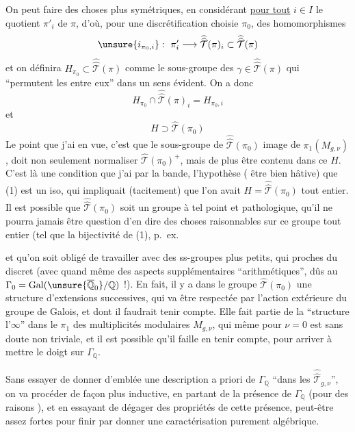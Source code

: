 On peut faire des choses plus symétriques, en considérant \uline{pour tout} $i\in I$ le quotient  $\pi'_i$ de $\pi$, d'où, pour une discrétification choisie $\pi_0$, des homomorphismes
\[
\unsure{i_{\pi_0,i}}:\ \pi'_i\longrightarrow
\widehat{\widehat{\mathcal T}}(\pi)_i\subset
\widehat{\widehat{\mathcal T}}(\pi)
\]
et on définira $H_{\pi_0}\subset\widehat{\widehat{\mathcal T}}(\pi)$ comme le sous-groupe des $\gamma\in\widehat{\widehat{\mathcal T}}(\pi)$ qui ``permutent les  entre eux'' dans un sens évident. On a donc
\[
\tag{7}
H_{\pi_0}\cap\widehat{\widehat{\mathcal T}}(\pi)_i=H_{\pi_0,i}
\]
et
\[
\tag{8}
H\supset\widehat{\mathcal T}(\pi_0)
\]
Le point que j'ai en vue, c'est que le sous-groupe de $\widehat{\widehat{\mathcal T}}(\pi_0)$ image de $\pi_1(M_{g,\nu})$, doit non seulement normaliser $\widehat{\mathcal T}(\pi_0)^+$, mais de plus être contenu dans ce $H$. C'est là une condition que j'ai  par la bande,  l'hypothèse ( être bien hâtive) que (1) est un iso, qui impliquait (tacitement) que l'on avait $H=\widehat{\widehat{\mathcal T}}(\pi_0)$ tout entier. Il est possible que $\widehat{\widehat{\mathcal T}}(\pi_0)$ soit un groupe à tel point  et pathologique, qu'il ne pourra jamais être question d'en dire des choses raisonnables  sur  ce groupe tout entier (tel que la bijectivité de (1), p.\ ex.



et qu'on soit obligé de travailler avec des ss-groupes plus petits, qui  proches du discret (avec quand même des aspects supplémentaires ``arithmétiques'', dûs au $\Gamma_0=\mathrm{Gal}(\unsure{\overline{\mathbb Q}_0}/\mathbb Q)$ !). En fait, il y a  dans le groupe $\widehat{\mathcal T}(\pi_0)$ une structure  d'extensions successives, qui va être respectée par l'action extérieure du groupe de Galois, et dont il faudrait tenir compte. Elle fait partie de la ``structure  l'$\infty$'' dans le $\pi_1$ des  multiplicités modulaires $M_{g,\nu}$, qui même pour $\nu=0$ est sans doute non triviale, et il est possible qu'il faille en tenir compte, pour arriver à mettre le doigt sur $\Gamma_{\mathbb Q}$.

Sans essayer de donner d'emblée une description a priori de $\Gamma_{\mathbb Q}$ ``dans les $\widehat{\widehat{\mathcal T}}_{g,\nu}$'', on va procéder de façon plus inductive, en partant de la présence de $\Gamma_{\mathbb Q}$ (pour des raisons ), et en essayant de dégager des propriétés de cette présence, peut-être assez fortes pour finir par donner une caractérisation purement algébrique.

